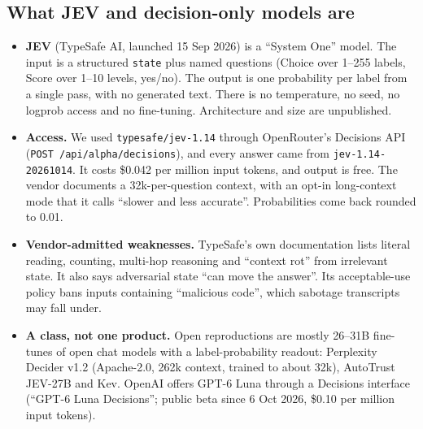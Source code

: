 \documentclass[11pt]{article}
\begin{document}
\subsection{What JEV and decision-only models are}
\begin{itemize}
\item \textbf{JEV} (TypeSafe AI, launched 15 Sep 2026) is a ``System One'' model. The input is a structured \texttt{state} plus named questions (Choice over 1--255 labels, Score over 1--10 levels, yes/no). The output is one probability per label from a single pass, with no generated text. There is no temperature, no seed, no logprob access and no fine-tuning. Architecture and size are unpublished.
\item \textbf{Access.} We used \texttt{typesafe/jev-1.14} through OpenRouter's Decisions API (\texttt{POST /api/alpha/decisions}), and every answer came from \texttt{jev-1.14-20261014}. It costs \$0.042 per million input tokens, and output is free. The vendor documents a 32k-per-question context, with an opt-in long-context mode that it calls ``slower and less accurate''. Probabilities come back rounded to 0.01.
\item \textbf{Vendor-admitted weaknesses.} TypeSafe's own documentation lists literal reading, counting, multi-hop reasoning and ``context rot'' from irrelevant state. It also says adversarial state ``can move the answer''. Its acceptable-use policy bans inputs containing ``malicious code'', which sabotage transcripts may fall under.
\item \textbf{A class, not one product.} Open reproductions are mostly 26--31B fine-tunes of open chat models with a label-probability readout: Perplexity Decider v1.2 (Apache-2.0, 262k context, trained to about 32k), AutoTrust JEV-27B and Kev. OpenAI offers GPT-6 Luna through a Decisions interface (``GPT-6 Luna Decisions''; public beta since 6 Oct 2026, \$0.10 per million input tokens).
\end{itemize}
\end{document}
